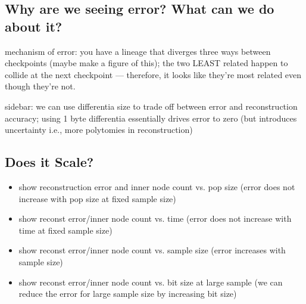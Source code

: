 \subsection{Why are we seeing error? What can we do about it?} \label{sec:error-uncertainty}

mechanism of error: you have a lineage that diverges three ways between checkpoints (maybe make a figure of this); the two LEAST related happen to collide at the next checkpoint --- therefore, it looks like they're most related even though they're not.

sidebar: we can use differentia size to trade off between error and reconstruction accuracy; using 1 byte differentia essentially drives error to zero (but introduces uncertainty i.e., more polytomies in reconstruction)

\subsection{Does it Scale?} \label{sec:scaling}




\begin{itemize}
    \item show reconstruction error and inner node count vs. pop size (error does not increase with pop size at fixed sample size)
    \item show reconst error/inner node count vs. time (error does not increase with time at fixed sample size)
    \item show reconst error/inner node count vs. sample size (error increases with sample size)
    \item show reconst error/inner node count vs. bit size at large sample (we can reduce the error for large sample size by increasing bit size)
\end{itemize}

